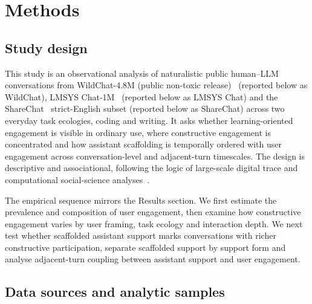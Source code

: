 \section{Methods}\label{sec6}

\subsection{Study design}

This study is an observational analysis of naturalistic public human--LLM conversations from WildChat-4.8M (public non-toxic release)~\cite{allenai2025wildchat48m} (reported below as WildChat), LMSYS Chat-1M~\cite{zheng2023lmsyschat1m} (reported below as LMSYS Chat) and the ShareChat~\cite{yan2025sharechat} strict-English subset (reported below as ShareChat) across two everyday task ecologies, coding and writing. It asks whether learning-oriented engagement is visible in ordinary use, where constructive engagement is concentrated and how assistant scaffolding is temporally ordered with user engagement across conversation-level and adjacent-turn timescales. The design is descriptive and associational, following the logic of large-scale digital trace and computational social-science analyses~\cite{lazer2009computational,salganik2017bitbybit}. 

The empirical sequence mirrors the Results section. We first estimate the prevalence and composition of user engagement, then examine how constructive engagement varies by user framing, task ecology and interaction depth. We next test whether scaffolded assistant support marks conversations with richer constructive participation, separate scaffolded support by support form and analyse adjacent-turn coupling between assistant support and user engagement. 

\subsection{Data sources and analytic samples}

